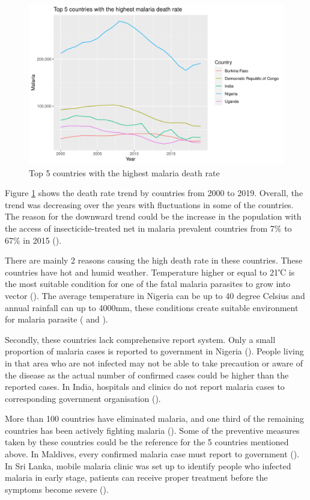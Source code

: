 \documentclass[11pt,a4paper,]{article}
\begin{document}
\begin{figure}[H]
\includegraphics[width=0.7\linewidth]{report_files/figure-latex/countrygraph-1} \caption{Top 5 countries with the highest malaria death rate}\label{fig:countrygraph}
\end{figure}

Figure \ref{fig:countrygraph} shows the death rate trend by countries from 2000 to 2019. Overall, the trend was decreasing over the years with fluctuations in some of the countries. The reason for the downward trend could be the increase in the population with the access of insecticide-treated net in malaria prevalent countries from 7\% to 67\% in 2015 (\textcite{MalariaTrend}).

There are mainly 2 reasons causing the high death rate in these countries. These countries have hot and humid weather. Temperature higher or equal to 21℃ is the most suitable condition for one of the fatal malaria parasites to grow into vector (\textcite{climate}). The average temperature in Nigeria can be up to 40 degree Celsius and annual rainfall can up to 4000mm, these conditions create suitable environment for malaria parasite (\textcite{Nigeria} and \textcite{climate}).

Secondly, these countries lack comprehensive report system. Only a small proportion of malaria cases is reported to government in Nigeria (\textcite{Nigeria2}). People living in that area who are not infected may not be able to take precaution or aware of the disease as the actual number of confirmed cases could be higher than the reported cases. In India, hospitals and clinics do not report malaria cases to corresponding government organisation (\textcite{India}).

More than 100 countries have eliminated malaria, and one third of the remaining countries has been actively fighting malaria (\textcite{precautions}). Some of the preventive measures taken by these countries could be the reference for the 5 countries mentioned above. In Maldives, every confirmed malaria case must report to government (\textcite{India}). In Sri Lanka, mobile malaria clinic was set up to identify people who infected malaria in early stage, patients can receive proper treatment before the symptoms become severe (\textcite{India}).
\end{document}
